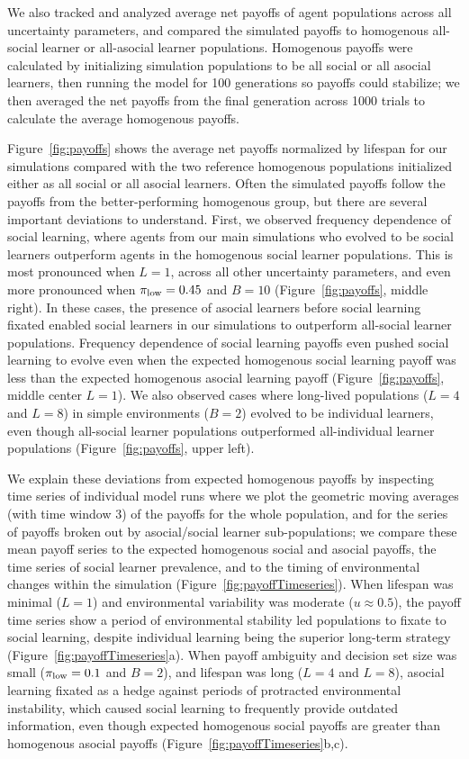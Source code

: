 \documentclass[letterpaper,11.5pt]{scrartcl}
\begin{document}
We also tracked and analyzed average net payoffs of agent populations across
all uncertainty parameters, and compared the simulated payoffs to 
homogenous all-social learner or all-asocial learner populations. Homogenous payoffs
were calculated by initializing simulation populations to be all social or all asocial learners,
then running the model for 100 generations so payoffs could stabilize; we then averaged 
the net payoffs from the final generation across 1000 trials to calculate the average
homogenous payoffs.

Figure~\ref{fig:payoffs} shows the average net payoffs normalized by lifespan
for our simulations compared with the two reference homogenous populations
initialized either as all social or all asocial learners.
Often the simulated payoffs follow the payoffs from the better-performing
homogenous group, but there are several important deviations to understand.
First, we observed frequency dependence of social learning, where 
agents from our main simulations who evolved to be social learners 
outperform agents in the homogenous social learner populations. This is most
pronounced when $L=1$, across all other uncertainty parameters, and even more
pronounced when $\pi_{\mathrm{low}}=0.45$ and $B=10$ (Figure~\ref{fig:payoffs}, middle right).
In these cases, the presence of asocial learners before social learning fixated
enabled social learners in our simulations to outperform all-social learner populations.
Frequency dependence of social learning payoffs even pushed social learning to evolve even
when the expected homogenous social learning payoff was less than the expected homogenous
asocial learning payoff (Figure~\ref{fig:payoffs}, middle center $L=1$).
We also observed cases where long-lived populations ($L=4$ and $L=8$) in simple environments
($B=2$) evolved to be individual learners, even though all-social learner populations
outperformed all-individual learner populations (Figure~\ref{fig:payoffs}, upper left).

We explain these deviations from expected homogenous payoffs 
by inspecting time series of individual model runs where we plot the geometric
moving averages (with time window 3) of the payoffs for the whole population, and
for the series of payoffs broken out by asocial/social learner sub-populations; we
compare these mean payoff series to the expected homogenous social and asocial payoffs, the time series of social learner prevalence, and to the timing of environmental changes within the simulation (Figure~\ref{fig:payoffTimeseries}). 
When lifespan was minimal ($L=1$) and environmental variability
was moderate ($u\approx0.5$), the payoff time series show a period of environmental
stability led populations to fixate to social learning, despite individual learning
being the superior long-term strategy (Figure~\ref{fig:payoffTimeseries}a).
When payoff ambiguity and decision set size was small ($\pi_{\mathrm{low}}=0.1$ and $B=2$), 
and lifespan was long ($L=4$ and $L=8$),
asocial learning fixated as a hedge against periods of protracted environmental
instability, which caused social learning to frequently provide
outdated information, even though expected homogenous social payoffs are greater than
homogenous asocial payoffs (Figure~\ref{fig:payoffTimeseries}b,c).
\end{document}
